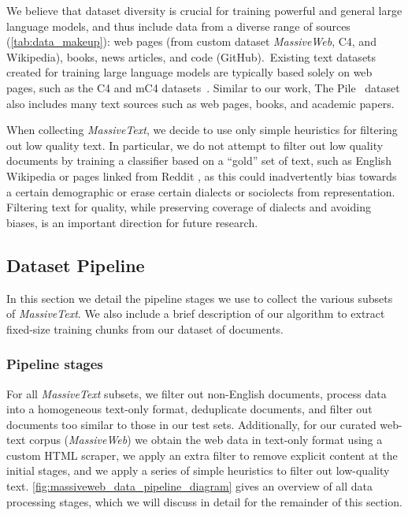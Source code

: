 \documentclass[11pt, a4paper, logo, internal, copyright, nonumbering]{deepmind}
\newcommand{\massivetext}{\textit{MassiveText}\xspace}
\newcommand{\massiveweb}{\textit{MassiveWeb}\xspace}
\begin{document}
We believe that dataset diversity is crucial for training powerful and general large language models, and thus include data from a diverse range of sources (\autoref{tab:data_makeup}): web pages (from custom dataset \massiveweb, C4, and Wikipedia), books, news articles, and code (GitHub).\ Existing text datasets created for training large language models are typically based solely on web pages, such as the C4 and mC4 datasets~\citep{raffel2020exploring, xue2020mt5}. Similar to our work, The Pile~\citep{pile} dataset also includes many text sources such as web pages, books, and academic papers.

When collecting \massivetext, we decide to use only simple heuristics for filtering out low quality text.
In particular, we do not attempt to filter out low quality documents by training a classifier based on a ``gold'' set of text, such as English Wikipedia or pages linked from Reddit \citep{radford2019language}, as this could inadvertently bias towards a certain demographic or erase certain dialects or sociolects from representation. Filtering text for quality, while preserving coverage of dialects and avoiding biases, is an important direction for future research.

\subsection{Dataset Pipeline}
\label{sec:dataset-pipeline}
In this section we detail the pipeline stages we use to collect the various subsets of \massivetext. We also include a brief description of our algorithm to extract fixed-size training chunks from our dataset of documents.


\subsubsection{Pipeline stages}
\label{app:dataset_pipeline_stages}


For all \massivetext subsets, we filter out non-English documents, process data into a homogeneous text-only format, deduplicate documents, and filter out documents too similar to those in our test sets. 
Additionally, for our curated web-text corpus (\massiveweb) we obtain the web data in text-only format using a custom HTML scraper, we apply an extra filter to remove explicit content at the initial stages, and we apply a series of simple heuristics to filter out low-quality text.
\autoref{fig:massiveweb_data_pipeline_diagram} gives an overview of all data processing stages, which we will discuss in detail for the remainder of this section.
\end{document}
